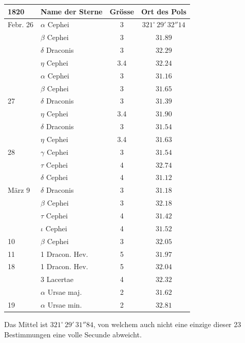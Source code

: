 \begin{center}
\begin{tabular}{l|l|c|c}
1820 & Name der Sterne & Grösse & Ort des Pols \\
\hline
Febr. 26 & $\alpha$ Cephei & 3 & $321^\circ\,29'\,32''14$ \\
 & $\beta$ Cephei & 3 & $31.89$ \\
 & $\delta$ Draconis & 3 & $32.29$ \\
 & $\eta$ Cephei & 3.4 & $32.24$ \\
 & $\alpha$ Cephei & 3 & $31.16$ \\
 & $\beta$ Cephei & 3 & $31.65$ \\
27 & $\delta$ Draconis & 3 & $31.39$ \\
 & $\eta$ Cephei & 3.4 & $31.90$ \\
 & $\delta$ Draconis & 3 & $31.54$ \\
 & $\eta$ Cephei & 3.4 & $31.63$ \\
28 & $\gamma$ Cephei & 3 & $31.54$ \\
 & $\tau$ Cephei & 4 & $32.74$ \\
 & $\delta$ Cephei & 4 & $31.12$ \\
März 9 & $\delta$ Draconis & 3 & $31.18$ \\
 & $\beta$ Cephei & 3 & $32.18$ \\
 & $\tau$ Cephei & 4 & $31.42$ \\
 & $\iota$ Cephei & 4 & $31.52$ \\
10 & $\beta$ Cephei & 3 & $32.05$ \\
11 & 1 Dracon. Hev. & 5 & $31.97$ \\
18 & 1 Dracon. Hev. & 5 & $32.04$ \\
 & 3 Lacertae & 4 & $32.32$ \\
 & $\alpha$ Ursae maj. & 2 & $31.62$ \\
19 & $\alpha$ Ursae min. & 2 & $32.81$ \\
\end{tabular}
\end{center}

\par\indent Das Mittel ist $321^\circ\,29'\,31''84$, von welchem auch nicht eine einzige dieser 23
Bestimmungen eine volle Secunde abweicht.


